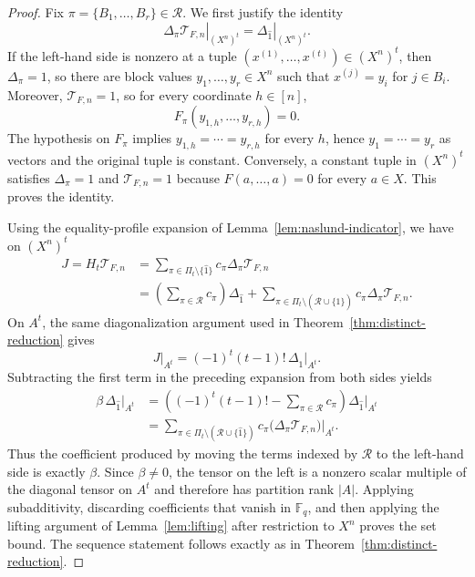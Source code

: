 \documentclass[10pt,a4paper]{amsart}
\theoremstyle{definition}
\newcommand{\F}{\mathbb F}
\newcommand{\1}{\mathbf 1}
\newcommand{\Tau}{\mathcal T}
\begin{document}
\begin{proof}
Fix $\pi=\{B_1,\ldots,B_r\}\in\mathcal R$.  We first justify the identity
\[
 \left.\Delta_\pi\Tau_{F,n}\right|_{(X^n)^t}
 =\left.\Delta_{\widehat1}\right|_{(X^n)^t}.
\]
If the left-hand side is nonzero at a tuple
$(x^{(1)},\ldots,x^{(t)})\in(X^n)^t$, then $\Delta_\pi=1$, so there are block values
$y_1,\ldots,y_r\in X^n$ such that $x^{(j)}=y_i$ for $j\in B_i$.  Moreover, $\Tau_{F,n}=1$, so for every coordinate $h\in[n]$,
\[
 F_\pi(y_{1,h},\ldots,y_{r,h})=0.
\]
{The hypothesis on \(F_\pi\) implies
\(y_{1,h}=\cdots=y_{r,h}\) for every \(h\), hence
\(y_1=\cdots=y_r\) as vectors and the original tuple is constant.}  Conversely, a constant tuple in $(X^n)^t$ satisfies $\Delta_\pi=1$ and $\Tau_{F,n}=1$ because $F(a,\ldots,a)=0$ for every $a\in X$.  This proves the identity.

Using the equality-profile expansion of Lemma~\ref{lem:naslund-indicator}, we have on $(X^n)^t$
\[
 \begin{aligned}
 J=H_t\Tau_{F,n}
 &=\sum_{\pi\in\Pi_t\setminus\{\widehat1\}}
 c_\pi\Delta_\pi\Tau_{F,n}\\
 &=\left(\sum_{\pi\in\mathcal R}c_\pi\right)\Delta_{\widehat1}
 +\sum_{\pi\in\Pi_t\setminus(\mathcal R\cup\{\widehat1\})}
 c_\pi\Delta_\pi\Tau_{F,n}.
 \end{aligned}
\]
On $A^t$, the same diagonalization argument used in Theorem~\ref{thm:distinct-reduction} gives
\[
 J\big|_{A^t}=(-1)^t(t-1)!\,\Delta_{\widehat1}\big|_{A^t}.
\]
Subtracting the first term in the preceding expansion from both sides yields
\[
 \begin{aligned}
 \beta\,\Delta_{\widehat1}\big|_{A^t}
 &=\left((-1)^t(t-1)!-\sum_{\pi\in\mathcal R}c_\pi\right)
   \Delta_{\widehat1}\big|_{A^t}\\
 &=\sum_{\pi\in\Pi_t\setminus(\mathcal R\cup\{\widehat1\})}
 c_\pi\bigl(\Delta_\pi\Tau_{F,n}\bigr)\big|_{A^t}.
 \end{aligned}
\]
{Thus the coefficient produced by moving the terms indexed by $\mathcal R$ to the left-hand side is exactly $\beta$.}  Since $\beta\ne0$, the tensor on the left is a nonzero scalar multiple of the diagonal tensor on $A^t$ and therefore has partition rank $|A|$.  Applying subadditivity, discarding coefficients that vanish in $\F_q$, and then applying the lifting argument of Lemma~\ref{lem:lifting} after restriction to $X^n$ proves the set bound.  The sequence statement follows exactly as in Theorem~\ref{thm:distinct-reduction}.
\end{proof}
\end{document}
